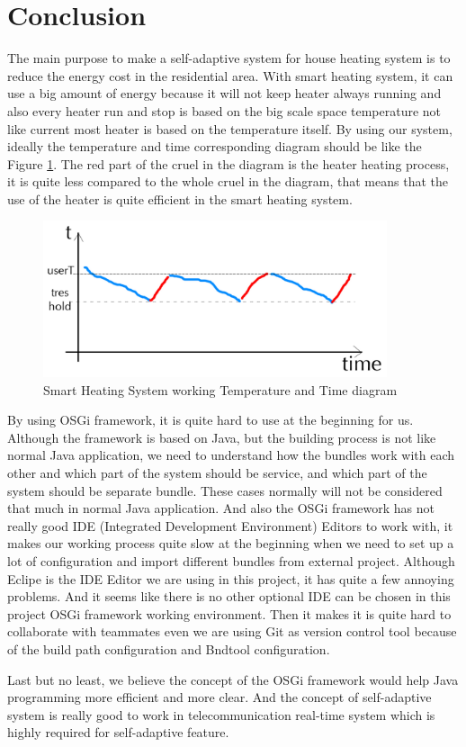 \section{Conclusion}
\label{sec:conclusion}
\par The main purpose to make a self-adaptive system for house heating system is to reduce the energy cost in the residential area. With smart heating system, it can use a big amount of energy because it will not keep heater always running and also every heater run and stop is based on the big scale space temperature not like current most heater is based on the temperature itself. By using our system, ideally the temperature and time corresponding diagram should be like the Figure \ref{fig:system_goal}. The red part of the cruel in the diagram is the heater heating process, it is quite less compared to the whole cruel in the diagram, that means that the use of the heater is quite efficient in the smart heating system.

\begin{figure}
	\centering    	
\includegraphics[width=0.90\textwidth,natwidth=610,natheight=642]{figs/system_goal.png}
  	\caption{Smart Heating System working Temperature and Time diagram}
  	\label{fig:system_goal}
\end{figure}

\par By using OSGi framework, it is quite hard to use at the beginning for us. Although the framework is based on Java, but the building process is not like normal Java application, we need to understand how the bundles work with each other and which part of the system should be service, and which part of the system should be separate bundle. These cases normally will not be considered that much in normal Java application. And also the OSGi framework has not really good IDE (Integrated Development Environment) Editors to work with, it makes our working process quite slow at the beginning when we need to set up a lot of configuration and import different bundles from external project. Although Eclipe is the IDE Editor we are using in this project, it has quite a few annoying problems. And it seems like there is no other optional IDE can be chosen in this project OSGi framework working environment. Then it makes it is quite hard to collaborate with teammates even we are using Git as version control tool because of the build path configuration and Bndtool configuration.

\par Last but no least, we believe the concept of the OSGi framework would help Java programming more efficient and more clear. And the concept of self-adaptive system is really good to work in telecommunication real-time system which is highly required for self-adaptive feature. 